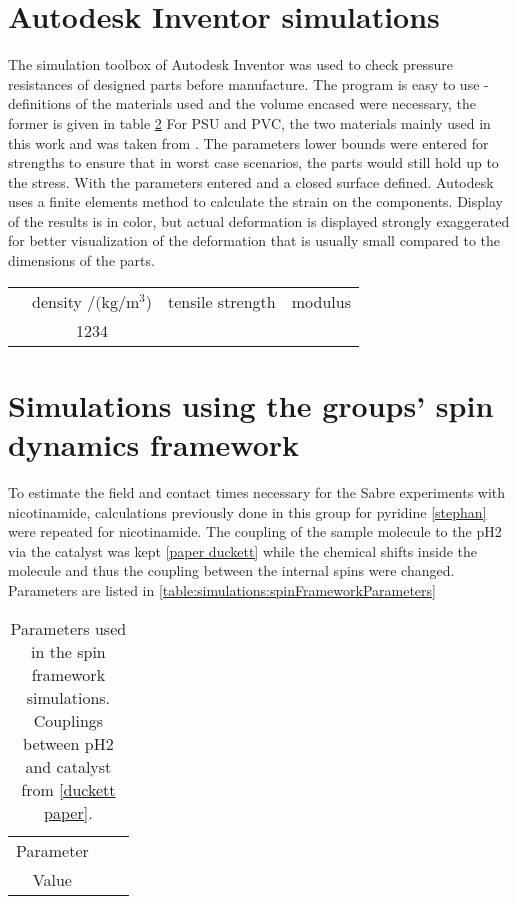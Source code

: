     \section{Autodesk Inventor simulations}
        The simulation toolbox of Autodesk Inventor was used to check pressure resistances of designed parts before manufacture. The program is easy to use - definitions of the materials used and the volume encased were necessary, the former is given in table \ref{} For PSU and PVC, the two materials mainly used in this work and was taken from . The parameters lower bounds were entered for strengths to ensure that in worst case scenarios, the parts would still hold up to the stress. With the parameters entered and a closed surface defined. Autodesk uses a finite elements method to calculate the strain on the components. Display of the results is in color, but actual deformation is displayed strongly exaggerated for better visualization of the deformation that is usually small compared to the dimensions of the parts.
        \begin{table}
            \centering
            \begin{tabular}{cccc}
                & density /$(\si{\kg}/\si{\meter\cubed}$) & tensile strength & modulus \\
                & 1234 & 
            \end{tabular}
        \end{table}
    \section{Simulations using the groups' spin dynamics framework}
        To estimate the field and contact times necessary for the Sabre experiments with nicotinamide, calculations previously done in this group for pyridine \ref{stephan} were repeated for nicotinamide. The coupling of the sample molecule to the pH2 via the catalyst was kept \ref{paper duckett} while the chemical shifts inside the molecule and thus the coupling between the internal spins were changed. Parameters are listed in \ref{table:simulations:spinFrameworkParameters}
        \begin{table}
        \centering
            \begin{tabular}{ccc}
                Parameter & \\
                Value & 
            \end{tabular}
            \caption[Spin framework parameters]{Parameters used in the spin framework simulations. Couplings between pH2 and catalyst from \ref{duckett paper}. }
        \end{table}
